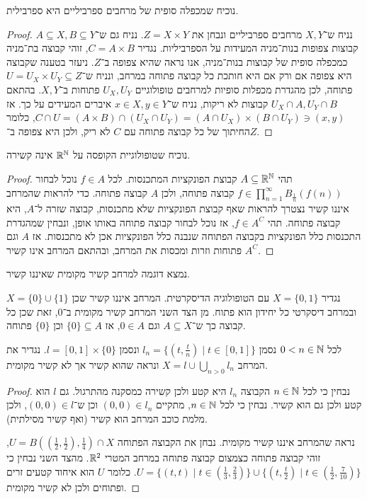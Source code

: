 \question{}
נוכיח שמכפלה סופית של מרחבים ספרביליים היא ספרבילית.
\begin{proof}
	נניח ש־$X, Y$ מרחבים ספרביליים ונבחן את $Z = X \times Y$.
	נניח גם ש־$A \subseteq X, B \subseteq Y$ קבוצות צפופות בנות־מניה המעידות על הספרביליות.
	נגדיר $C = A \times B$, זוהי קבוצה בת־מניה כמכפלה סופית של קבוצות בנות־מניה, אנו נראה שהיא צפופה ב־$Z$.
	ניעזר בטענה שקבוצה היא צפופה אם ורק אם היא חותכת כל קבוצה פתוחה במרחב, ונניח ש־$U = U_X \times U_Y \subseteq Z$ פתוחה, לכן מהגדרת מכפלות סופיות למרחבים טופולוגיים $U_X, U_Y$ פתוחות ב־$X, Y$.
	בהתאם $U_X \cap A, U_Y \cap B$ קבוצות לא ריקות, נניח ש־$x \in X, y \in Y$ איברים המעידים על כך.
	אז $C \cap U = (A \times B) \cap (U_X \cap U_Y) = (A \cap U_X) \times (B \cap U_Y) \ni (x, y)$, כלומר החיתוך של כל קבוצה פתוחה עם $C$ לא ריק, ולכן היא צפופה ב־$Z$.
\end{proof}

\question[6]
נוכיח שטופולוגיית הקופסה על $\mathbb{R}^{\mathbb{N}}$ אינה קשירה.
\begin{proof}
	תהי $A \subseteq \mathbb{R}^{\mathbb{N}}$ קבוצת הפונקציות המתכנסות.
	לכל $f \in A$ נוכל לבחור $f \in \prod_{n = 1}^\infty B_{\frac{1}{n}}(f(n))$ קבוצה פתוחה, ולכן $A$ קבוצה פתוחה.
	כדי להראות שהמרחב איננו קשיר נצטרך להראות שאף קבוצת הפונקציות שלא מתכנסות, קבוצה שזרה ל־$A$, היא קבוצה פתוחה.
	תהי $f \in A^C$, אז נוכל לבחור קבוצה פתוחה באותו אופן, ונבחין שמהגדרת התכנסות כלל הפונקציות בקבוצה הפתוחה שנבנה כלל הפונקציות אכן לא מתכנסות.
	אז $A$ וגם $A^C$ פתוחות וזרות ומכסות את המרחב, ובהתאם המרחב אינו קשיר.
\end{proof}

\question{}
\subquestion{}
נמצא דוגמה למרחב קשיר מקומית שאיננו קשיר.
\begin{solution}
	נגדיר $X = \{0, 1\}$ עם הטופולוגיה הדיסקרטית.
	המרחב איננו קשיר שכן $X = \{ 0 \} \cup \{ 1 \}$ ובמרחב דיסקרטי כל יחידון הוא פתוח.
	מן הצד השני המרחב קשיר מקומית ב־$0$, זאת שכן כל קבוצה כך ש־$A \subseteq X$ וגם $0 \in A$, אז $\{ 0 \} \subseteq A$ וכן $\{ 0 \}$ פתוחה.
\end{solution}

\subquestion{}
לכל $0 < n \in \mathbb{N}$ נסמן $l_n = \{ (t, \frac{t}{n}) \mid t \in [0, 1] \}$ ונסמן $l = [0, 1] \times \{ 0 \}$.
נגדיר את המרחב $X = l \cup \bigcup_{n > 0} l_n$ ונראה שהוא קשיר אך לא קשיר מקומית.
\begin{proof}
	נבחין כי לכל $n \in \mathbb{N}$ הקבוצה $l_n$ היא קטע ולכן קשירה כמסקנה מהתרגול.
	גם $l$ הוא קטע ולכן גם הוא קשיר.
	נבחין כי לכל $n \in \mathbb{N}$, מתקיים $(0, 0) \in l_n$ וכן ש־$(0, 0) \in l$, ולכן מלמת כוכב המרחב הוא קשיר (ואף קשיר מסילתית).

	נראה שהמרחב איננו קשיר מקומית.
	נבחן את הקבוצה הפתוחה $U = B((\frac{1}{2}, \frac{1}{2}), \frac{1}{4}) \cap X$, זוהי קבוצה פתוחה כצמצום קבוצה פתוחה במרחב המטרי $\mathbb{R}^2$.
	מהצד השני נבחין כי $U = \{ (t, t) \mid t \in (\frac{1}{3}, \frac{2}{3}) \} \cup \{ (t, \frac{t}{2}) \mid t \in (\frac{1}{2}, \frac{7}{10}) \}$.
	כלומר $U$ הוא איחוד קטעים זרים ופתוחים ולכן לא קשיר מקומית.
\end{proof}


